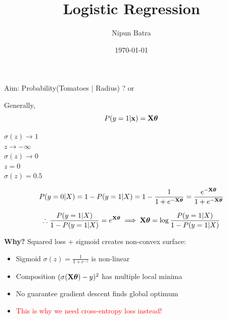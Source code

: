 \documentclass{beamer}
\title{Logistic Regression}
\date{\today}
\author{Nipun Batra}
\institute{IIT Gandhinagar}
\begin{document}
\maketitle

\begin{frame}Aim: Probability(Tomatoes $|$ Radius) ? or
	\pause {}
	
\end{frame}

\begin{frame}Generally,
\begin{equation*}
P(y = 1 | \mathbf{x}) = \mathbf{X}\boldsymbol{\theta}
\end{equation*}
\end{frame}
\begin{frame}$\sigma(z) \rightarrow 1$\\
\pause $z \rightarrow -\infty$\\
 \pause $\sigma(z) \rightarrow 0$\\
 \pause $z = 0$\\
 \pause $\sigma(z) = 0.5$

\end{frame}

\begin{frame}\begin{equation*}
P(y = 0 | X) = 1 - P(y = 1 | X) = 1 - \frac{1}{1 + e^{-\mathbf{X}\boldsymbol{\theta}}} = \frac{e^{-\mathbf{X}\boldsymbol{\theta}}}{1 + e^{-\mathbf{X}\boldsymbol{\theta}}} 
\end{equation*}

\pause \begin{equation*}
\therefore \frac{P(y = 1|X)}{1 - P(y = 1|X)} = e^{\mathbf{X}\boldsymbol{\theta}}
\implies \mathbf{X}\boldsymbol{\theta} = \log\frac{P(y = 1|X)}{1 - P(y = 1 | X)}
\end{equation*}
\end{frame}
\begin{frame}\textbf{Why?} Squared loss + sigmoid creates non-convex surface:
\begin{itemize}
\item Sigmoid $\sigma(z) = \frac{1}{1+e^{-z}}$ is non-linear
\item Composition $(\sigma(\mathbf{X}\boldsymbol{\theta}) - y)^2$ has multiple local minima
\pause
\item No guarantee gradient descent finds global optimum
\item \textcolor{red}{This is why we need cross-entropy loss instead!}
\end{itemize}
\end{frame}
\end{document}
